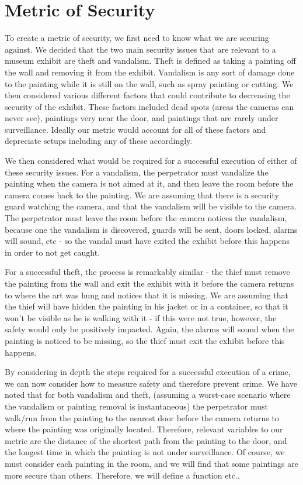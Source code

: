 \documentclass{article}
\begin{document}
	\section{Metric of Security}
	
	To create a metric of security, we first need to know what we are securing against. We decided that the two main security issues that are relevant to a museum exhibit are theft and vandalism. Theft is defined as taking a painting off the wall and removing it from the exhibit. Vandalism is any sort of damage done to the painting while it is still on the wall, such as spray painting or cutting. We then considered various different factors that could contribute to decreasing the security of the exhibit. These factors included dead spots (areas the cameras can never see), paintings very near the door, and paintings that are rarely under surveillance. Ideally our metric would account for all of these factors and depreciate setups including any of these accordingly.
	
	We then considered what would be required for a successful execution of either of these security issues. For a vandalism, the perpetrator must vandalize the painting when the camera is not aimed at it, and then leave the room before the camera comes back to the painting. We are assuming that there is a security guard watching the camera, and that the vandalism will be visible to the camera. The perpetrator must leave the room before the camera notices the vandalism, because one the vandalism is discovered, guards will be sent, doors locked, alarms will sound, etc - so the vandal must have exited the exhibit before this happens in order to not get caught. 
	
	For a successful theft, the process is remarkably similar - the thief must remove the painting from the wall and exit the exhibit with it before the camera returns to where the art was hung and notices that it is missing. We are assuming that the thief will have hidden the painting in his jacket or in a container, so that it won't be visible as he is walking with it - if this were not true, however, the safety would only be positively impacted. Again, the alarms will sound when the painting is noticed to be missing, so the thief must exit the exhibit before this happens. 
	
	By considering in depth the steps required for a successful execution of a crime, we can now consider how to measure safety and therefore prevent crime. We have noted that for both vandalism and theft, (assuming a worst-case scenario where the vandalism or painting removal is instantaneous) the perpetrator must walk/run from the painting to the nearest door before the camera returns to where the painting was originally located. Therefore, relevant variables to our metric are the distance of the shortest path from the painting to the door, and the longest time in which the painting is not under surveillance. Of course, we must consider each painting in the room, and we will find that some paintings are more secure than others. Therefore, we will define a function etc..
	
\end{document}

